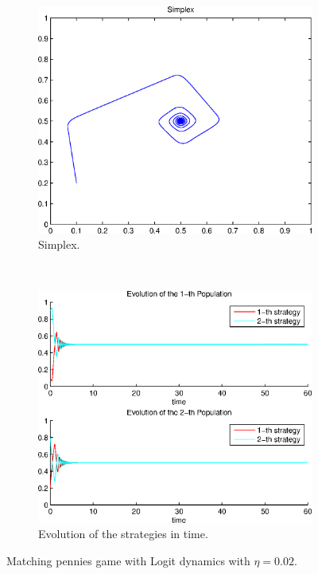 \begin{figure}[h]
  \centering
  \begin{subfigure}[b]{0.45\textwidth}
	  \includegraphics[width=\textwidth]{./images/test2_simplex_logit.eps}
	  \caption{Simplex.}
	  \label{fig:test2_simplex_logit}
  \end{subfigure}
  ~ 
  \begin{subfigure}[b]{0.45\textwidth}
	  \includegraphics[width=\textwidth]{./images/test2_ev_logit.eps}
	  \caption{Evolution of the strategies in time.}
	  \label{fig:test2_ev_logit}
  \end{subfigure}
  \caption{Matching pennies game with Logit dynamics with $\eta=0.02$.}
  \label{fig:mp_game_logit}
\end{figure}

